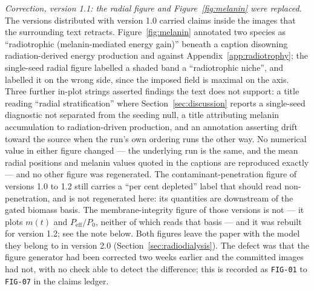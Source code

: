 \documentclass[11pt]{article}
\begin{document}
\emph{Correction, version 1.1: the radial figure and Figure~\ref{fig:melanin} were replaced.} The versions distributed with
version 1.0 carried claims inside the images that the surrounding text retracts. Figure~\ref{fig:melanin}
annotated two species as ``radiotrophic (melanin-mediated energy gain)'' beneath a caption
disowning radiation-derived energy production and against
Appendix~\ref{app:radiotrophy}; the single-seed radial figure labelled a shaded band a ``radiotrophic niche'',
and labelled it on the wrong side, since the imposed field is maximal on the axis. Three further
in-plot strings asserted findings the text does not support: a title reading ``radial
stratification'' where Section~\ref{sec:discussion} reports a single-seed diagnostic not separated from the seeding
null, a title attributing melanin accumulation to radiation-driven production, and an annotation
asserting drift toward the source when the run's own ordering runs the other way. No numerical
value in either figure changed --- the underlying run is the same, and the mean radial positions
and melanin values quoted in the captions are reproduced exactly --- and no other figure was
regenerated. The contaminant-penetration figure of versions 1.0 to 1.2 still carries a ``per cent depleted'' label that should read
non-penetration, and is not regenerated here: its quantities are downstream of the gated biomass
basis. The membrane-integrity figure of those versions is not --- it plots $m(t)$ and $P_{\mathrm{eff}}/P_0$, neither of which reads that
basis --- and it was rebuilt for version 1.2; see the note below. Both figures leave the paper with the model they belong to in version 2.0 (Section~\ref{sec:radiodialysis}). The defect was that the
figure generator had been corrected two weeks earlier and the committed images had not, with no
check able to detect the difference; this is recorded as \texttt{FIG-01} to \texttt{FIG-07} in the
claims ledger.
\end{document}
